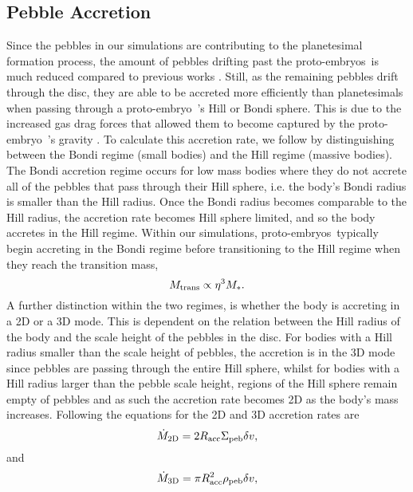 \documentclass[a4paper,fleqn,usenatbib]{mnras}
\newcommand{\emb}{{{proto-embryo~}}}
\newcommand{\embs}{{{proto-embryos~}}}
\begin{document}
\subsection{Pebble Accretion}
\label{sec:acc_peb}

Since the pebbles in our simulations are contributing to the planetesimal formation process, the amount of pebbles drifting past the \embs is much reduced compared to previous works \citep[e.g.][]{Lambrechts14,Bitsch15,Coleman19}.
Still, as the remaining pebbles drift through the disc, they are able to be accreted more efficiently than planetesimals when passing through a \emb's Hill or Bondi sphere.
This is due to the increased gas drag forces that allowed them to become captured by the \emb's gravity \citep{Lambrechts12}.
To calculate this accretion rate, we follow \citet{Johansen17} by distinguishing between the Bondi regime (small bodies) and the Hill regime (massive bodies).
The Bondi accretion regime occurs for low mass bodies where they do not accrete all of the pebbles that pass through their Hill sphere, i.e. the body's Bondi radius is smaller than the Hill radius.
Once the Bondi radius becomes comparable to the Hill radius, the accretion rate becomes Hill sphere limited, and so the body accretes in the Hill regime.
Within our simulations, \embs typically begin accreting in the Bondi regime before transitioning to the Hill regime when they reach the transition mass,
\begin{equation}
\label{eq:mtrans}
    M_{\rm trans} \propto \eta^3 M_*.
\end{equation}
A further distinction within the two regimes, is whether the body is accreting in a 2D or a 3D mode.
This is dependent on the relation between the Hill radius of the body and the scale height of the pebbles in the disc.
For bodies with a Hill radius smaller than the scale height of pebbles, the accretion is in the 3D mode since pebbles are passing through the entire Hill sphere, whilst for bodies with a Hill radius larger than the pebble scale height, regions of the Hill sphere remain empty of pebbles and as such the accretion rate becomes 2D as the body's mass increases.
Following \citet{Johansen17} the equations for the 2D and 3D accretion rates are
\begin{equation}
\dot{M}_{\rm 2D} = 2 R_{\rm acc} \Sigma_{\rm peb} \delta v,
\end{equation}
and
\begin{equation}
\dot{M}_{\rm 3D} = \pi R_{\rm acc}^2 \rho_{\rm peb} \delta v,
\end{equation}
\end{document}
